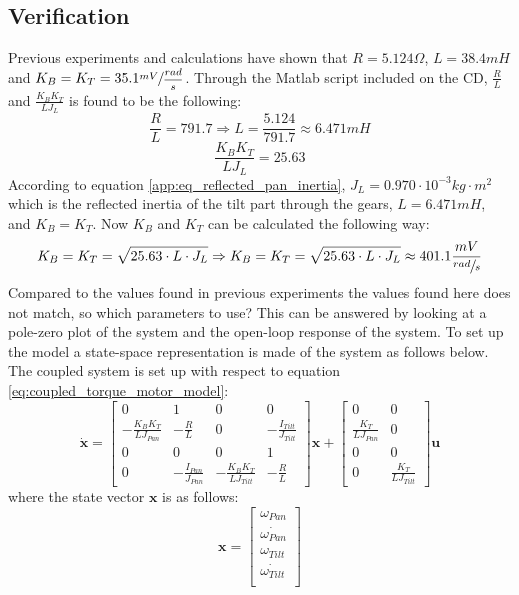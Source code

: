 \subsection{Verification}
Previous experiments and calculations have shown that $R = 5.124\Omega$, $L = 38.4mH$ and $K_B = K_T = 35.1 \sfrac{mV}{\dfrac{rad}{s}}$. Through the Matlab script included on the CD, $\frac{R}{L}$ and $\frac{K_B K_T}{L J_L}$ is found to be the following:
\begin{equation}
	\frac{R}{L} = 791.7 \Rightarrow L = \frac{5.124}{791.7} \approx 6.471mH
\end{equation}
\begin{equation}
	\frac{K_B K_T}{L J_L} = 25.63\label{eq:constants}
\end{equation}
According to equation \ref{app:eq_reflected_pan_inertia}, $J_L = 0.970 \cdot 10^{-3} kg \cdot m^{2}$ which is the reflected inertia of the tilt part through the gears, $L = 6.471mH$, and $K_B = K_T$. Now $K_B$ and $K_T$ can be calculated the following way:
\begin{equation}
	K_B = K_T = \sqrt{25.63 \cdot L \cdot J_L} \Rightarrow K_B = K_T = \sqrt{25.63 \cdot L \cdot J_L} \approx 401.1 \frac{mV}{\sfrac{rad}{s}}
\end{equation}
Compared to the values found in previous experiments the values found here does not match, so which parameters to use? This can be answered by looking at a pole-zero plot of the system and the open-loop response of the system. To set up the model a state-space representation is made of the system as follows below. The coupled system is set up with respect to equation \ref{eq:coupled_torque_motor_model}:
\[
 \dot{\textbf{x}} =
 \begin{bmatrix}
   0 & 1 & 0 & 0\\
   - \frac{K_B K_T}{L J_{Pan}} & - \frac{R}{L} & 0 & - \frac{I_{Tilt}}{J_{Tilt}}\\
   0 & 0 & 0 & 1\\
   0 & - \frac{I_{Pan}}{J_{Pan}} & - \frac{K_B K_T}{L J_{Tilt}} & - \frac{R}{L}
 \end{bmatrix}
 \textbf{x} +
 \begin{bmatrix}
   0 & 0\\
   \frac{K_T}{L J_{Pan}} & 0\\
   0 & 0\\
   0 & \frac{K_T}{L J_{Tilt}}
 \end{bmatrix}
 \textbf{u}
\]
where the state vector $\textbf{x}$ is as follows:
\[
 \textbf{x} =
 \begin{bmatrix}
   \omega_{Pan}\\
   \dot{\omega_{Pan}}\\
   \omega_{Tilt}\\
   \dot{\omega_{Tilt}}\\
 \end{bmatrix}
\]
